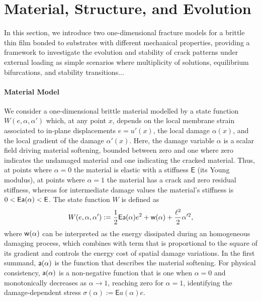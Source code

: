\section{Material, Structure, and Evolution}

In this section, we introduce two one-dimensional fracture models for a brittle thin film bonded to substrates with different mechanical properties, providing a framework to investigate the evolution and stability of crack patterns under external loading as simple scenarios where multiplicity of solutions, equilibrium bifurcations, and stability transitions...


\paragraph{Material Model}
We consider a one-dimensional brittle material modelled by a state function $W(e, \alpha, \alpha')$ which, at any point $x$,%
depends on the local membrane strain associated to in-plane displacements $e = u'(x)$, the local damage $\alpha(x)$, and the local gradient of the damage $\alpha'(x)$. Here, the damage variable $\alpha$ is a scalar field driving material softening, bounded between zero and one where zero indicates the undamaged material and one indicating the cracked material. Thus, at points where $\alpha=0$ the material is elastic with a stiffness $\mathsf{E}$ (its Young modulus), at points where $\alpha=1$ the material has a crack and zero residual stiffness, whereas for intermediate damage values the material's stiffness is $0<\mathsf{E}\mathsf{a}(\alpha)< \mathsf{E}$.  
The state function $W$ is defined as 
\begin{equation}
    \label{def:energy_material}
    W(e, \alpha, \alpha'):= \frac{1}{2} \mathsf{E} \mathsf{a}(\alpha)e^2 + \mathsf{w}(\alpha) + \frac{\ell^2}{2}\alpha'^2,
\end{equation}
where $\mathsf{w}(\alpha)$ can be interpreted as the energy dissipated during an homogeneous damaging process, which combines with term that is proportional to the square of its gradient and controls the energy cost of spatial damage variations. In the first summand, $\mathsf{a}(\alpha)$ is the function that describes the material softening. %
For physical consistency, $\mathsf{a}(\alpha)$ is a non-negative function that is one when $\alpha=0$ and monotonically decreases as $\alpha\to 1$, reaching zero for $\alpha=1$, identifying the damage-dependent stress $\sigma(\alpha):=\mathsf{E}a(\alpha) e$. 
